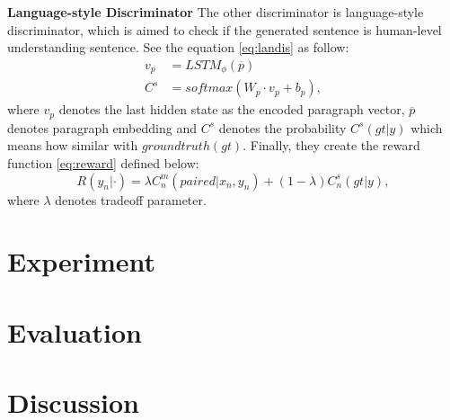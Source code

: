 \documentclass[11pt]{article}
\begin{document}
{\bf Language-style Discriminator} The other discriminator is language-style discriminator, which is aimed to check if the generated sentence is human-level understanding sentence. See the equation \ref{eq:landis} as follow:
\begin{equation}
\begin{aligned}
v_{p} &= LSTM_{\phi} (\overline{p}) \\
C^{s} &= softmax(W_{p} \cdot v_{p} + b_{p}),
\end{aligned}
\label{eq:landis}
\end{equation}
where $v_{p}$ denotes the last hidden state as the encoded paragraph vector, $\overline{p}$ denotes paragraph embedding and $C^{s}$ denotes the probability $C^{s}(gt|y)$ which means how similar with $ground truth(gt)$. Finally, they create the reward function \ref{eq:reward} defined below:
\begin{equation}
R(y_{n}|\cdot) = \lambda C_{n}^{m}(paired|x_n,y_n)+ (1 - \lambda) C_{n}^{s}(gt|y),
\label{eq:reward}
\end{equation}
where $\lambda$ denotes tradeoff parameter.

		
\section{Experiment}
	
\section{Evaluation}


\section{Discussion}



\end{document}
